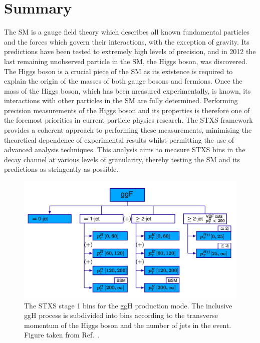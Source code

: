 \section{Summary}

The SM is a gauge field theory which describes all known fundamental particles 
and the forces which govern their interactions, with the exception of gravity.
Its predictions have been tested to extremely high levels of precision, 
and in 2012 the last remaining unobserved particle in the SM, the Higgs boson, was discovered.
The Higgs boson is a crucial piece of the SM as its existence is required to explain the origin
of the masses of both gauge bosons and fermions.
Once the mass of the Higgs boson, which has been measured experimentally, is known, 
its interactions with other particles in the SM are fully determined.
Performing precision measurements of the Higgs boson and its properties is therefore 
one of the foremost priorities in current particle physics research.
The STXS framework provides a coherent approach to performing 
these measurements, minimising the theoretical dependence of experimental results
whilst permitting the use of advanced analysis techniques.
This analysis aims to measure STXS bins in the \Hgg decay channel at various levels of granularity, 
thereby testing the SM and its predictions as stringently as possible.

\begin{figure}[hptb]
  \centering
  \includegraphics[width=\textwidth]{Figures/Theory/stage1ggH.png}
  \caption[Stage 1 STXS bins for the ggH production mode.]
  {
    The STXS stage 1 bins for the ggH production mode.
    The inclusive ggH process is subdivided into bins according to the transverse momentum 
    of the Higgs boson and the number of jets in the event.
    Figure taken from Ref.~\cite{YR4}.
  }
  \label{fig:theory_stage1ggH}
\end{figure}

